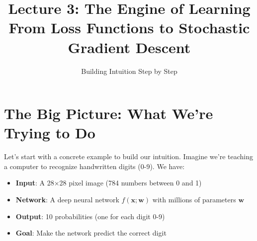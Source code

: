 \documentclass[11pt]{article}
\title{Lecture 3: The Engine of Learning \\ From Loss Functions to Stochastic Gradient Descent}
\author{Building Intuition Step by Step}
\date{}
\newcommand{\w}{\mathbf{w}}
\newcommand{\x}{\mathbf{x}}
\begin{document}
\maketitle
\thispagestyle{empty}
\tableofcontents
\newpage

\section{The Big Picture: What We're Trying to Do}

Let's start with a concrete example to build our intuition. Imagine we're teaching a computer to recognize handwritten digits (0-9). We have:

\begin{itemize}
\item \textbf{Input}: A 28×28 pixel image (784 numbers between 0 and 1)
\item \textbf{Network}: A deep neural network $f(\x; \w)$ with millions of parameters $\w$
\item \textbf{Output}: 10 probabilities (one for each digit 0-9)
\item \textbf{Goal}: Make the network predict the correct digit
\end{itemize}
\end{document}
